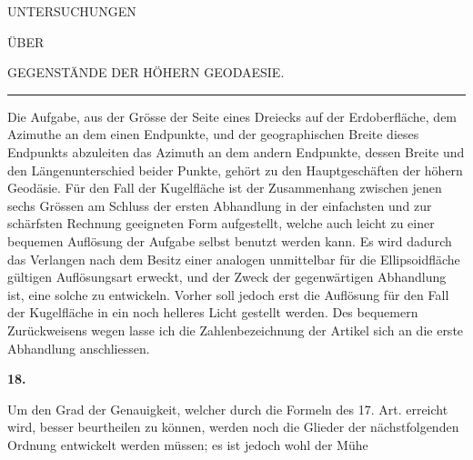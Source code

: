\renewcommand{\Article}[1]{\par\medskip\Needspace{4\baselineskip}\pdfbookmark[1]{Art. #1}{geodaesie2-art-#1}\centerline{\textbf{#1.}}\nobreak\smallskip}
\begin{center}
UNTERSUCHUNGEN\par\bigskip
ÜBER\par\bigskip
{\large GEGENSTÄNDE DER HÖHERN GEODAESIE.}\par\medskip
\rule{.65in}{.3pt}
\end{center}
\noindent\hspace*{\parindent}Die Aufgabe, aus der Grösse der Seite eines Dreiecks auf der Erdoberfläche, dem Azimuthe an dem einen Endpunkte, und der geographischen Breite dieses Endpunkts abzuleiten das Azimuth an dem andern Endpunkte, dessen Breite und den Längenunterschied beider Punkte, gehört zu den Hauptgeschäften der höhern Geodäsie. Für den Fall der Kugelfläche ist der Zusammenhang zwischen jenen sechs Grössen am Schluss der ersten Abhandlung in der einfachsten und zur schärfsten Rechnung geeigneten Form aufgestellt, welche auch leicht zu einer bequemen Auflösung der Aufgabe selbst benutzt werden kann. Es wird dadurch das Verlangen nach dem Besitz einer analogen unmittelbar für die Ellipsoidfläche gültigen Auflösungsart erweckt, und der Zweck der gegenwärtigen Abhandlung ist, eine solche zu entwickeln. Vorher soll jedoch erst die Auflösung für den Fall der Kugelfläche in ein noch helleres Licht gestellt werden. Des bequemern Zurückweisens wegen lasse ich die Zahlenbezeichnung der Artikel sich an die erste Abhandlung anschliessen.

\Article{18}
Um den Grad der Genauigkeit, welcher durch die Formeln des 17. Art. erreicht wird, besser beurtheilen zu können, werden noch die Glieder der nächstfolgenden Ordnung entwickelt werden müssen; es ist jedoch wohl der Mühe
